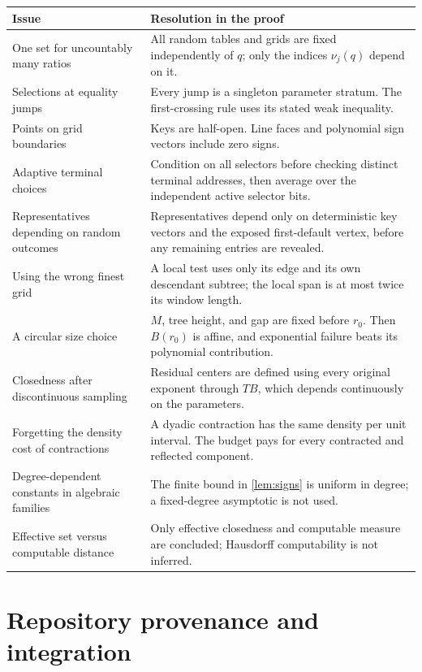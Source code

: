 \begin{longtable}{@{}>{\raggedright\arraybackslash}p{}>{\raggedright\arraybackslash}p{}@{}}
\toprule
Issue & Resolution in the proof\\
\midrule\endhead
One set for uncountably many ratios & All random tables and grids are
fixed independently of $q$; only the indices $\nu_j(q)$ depend on it.\\[3pt]
Selections at equality jumps & Every jump is a singleton parameter
stratum. The first-crossing rule uses its stated weak inequality.\\[3pt]
Points on grid boundaries & Keys are half-open. Line faces and
polynomial sign vectors include zero signs.\\[3pt]
Adaptive terminal choices & Condition on all selectors before checking
distinct terminal addresses, then average over the independent active
selector bits.\\[3pt]
Representatives depending on random outcomes & Representatives depend
only on deterministic key vectors and the exposed first-default
vertex, before any remaining entries are revealed.\\[3pt]
Using the wrong finest grid & A local test uses only its edge and its
own descendant subtree; the local span is at most twice its window
length.\\[3pt]
A circular size choice & $M$, tree height, and gap are fixed before
$r_0$. Then $B(r_0)$ is affine, and exponential failure beats its
polynomial contribution.\\[3pt]
Closedness after discontinuous sampling & Residual centers are defined
using every original exponent through $TB$, which depends continuously
on the parameters.\\[3pt]
Forgetting the density cost of contractions & A dyadic contraction
has the same density per unit interval. The budget pays for every
contracted and reflected component.\\[3pt]
Degree-dependent constants in algebraic families & The finite bound
in \cref{lem:signs} is uniform in degree; a fixed-degree asymptotic
is not used.\\[3pt]
Effective set versus computable distance & Only effective closedness
and computable measure are concluded; Hausdorff computability is
not inferred.\\
\bottomrule
\end{longtable}

\section{Repository provenance and integration}
\label{sec:provenance}

